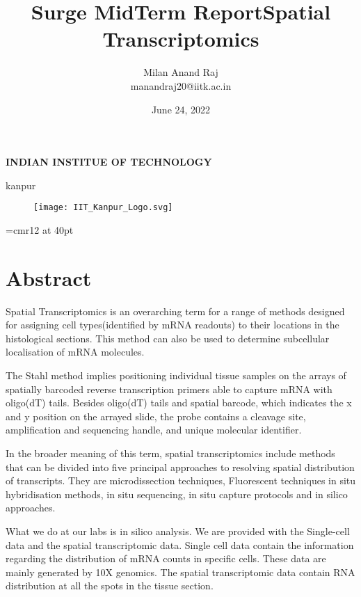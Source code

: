 \documentclass[16pt]{article}
\title{Surge MidTerm Report}
\author{Milan Anand Raj\\manandraj20@iitk.ac.in}
\date{June 24, 2022}
\begin{document}
\NoBgThispage


\maketitle
\begin{center}
\textbf{INDIAN INSTITUE OF TECHNOLOGY}

kanpur
\end{center}


\vfill
\begin{figure}
\centering
\texttt{[image: IIT\_Kanpur\_Logo.svg]}
\end{figure}
\newpage
{}
\tableofcontents
\clearpage
\font\myfont=cmr12 at 40pt
\begin{center}
\title{{\myfont Spatial Transcriptomics}}
\end{center}


\section{Abstract}
Spatial Transcriptomics is an overarching term for a range of methods designed for assigning cell types(identified by mRNA readouts) to their locations in the histological sections. This method can also be used to determine subcellular localisation of mRNA molecules.

The Stahl method implies positioning individual tissue samples on the arrays of spatially barcoded reverse transcription primers able to capture mRNA with oligo(dT) tails. Besides oligo(dT) tails and spatial barcode, which indicates the x and y position on the arrayed slide, the probe contains a cleavage site, amplification and sequencing handle, and unique molecular identifier.

In the broader meaning of this term, spatial transcriptomics include methods that can be divided into five principal approaches to resolving spatial distribution of transcripts. They are microdissection techniques, Fluorescent techniques in situ hybridisation methods, in situ sequencing, in situ capture protocols and in silico approaches.

What we do at our labs is in silico analysis. We are provided with the Single-cell data and the spatial transcriptomic data. Single cell data contain the information regarding the distribution of mRNA counts in specific cells. These data are mainly generated by 10X genomics. The spatial transcriptomic data contain RNA distribution at all the spots in the tissue section. 
\end{document}

